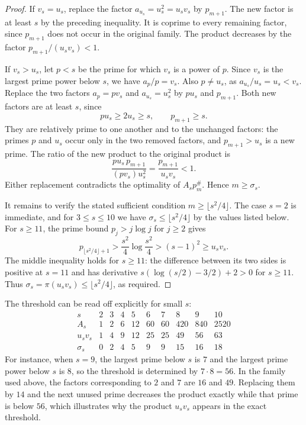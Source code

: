 \documentclass[11pt,onecolumn]{IEEEtran}
\newcommand{\primorial}[1]{p_{#1}^{\#}}
\begin{document}
\begin{proof}
If $v_s=u_s$, replace the factor
$a_{u_s}=u_s^2=u_sv_s$ by $p_{m+1}$.  The new factor is
at least $s$ by the preceding inequality.
It is coprime to every remaining factor, since
$p_{m+1}$ does not occur in the original family.
The product decreases by the factor
$p_{m+1}/(u_sv_s)<1$.

If $v_s>u_s$, let $p<s$ be the prime for which
$v_s$ is a power of $p$.  Since $v_s$ is the largest
prime power below $s$, we have $a_p/p=v_s$.
Also $p\ne u_s$, as $a_{u_s}/u_s=u_s<v_s$.
Replace the two factors $a_p=pv_s$ and
$a_{u_s}=u_s^2$ by $pu_s$ and $p_{m+1}$.
Both new factors are at least $s$, since
\[
 pu_s\ge2u_s\ge s,
 \qquad p_{m+1}\ge s.
\]
They are relatively prime to one another and to the
unchanged factors: the primes $p$ and $u_s$ occur only in
the two removed factors, and $p_{m+1}>u_s$ is a new prime.
The ratio of the new product to the original product is
\[
 \frac{pu_s\,p_{m+1}}{(pv_s)u_s^2}
 =\frac{p_{m+1}}{u_sv_s}<1.
\]
Either replacement contradicts the optimality of
$A_s\primorial{m}$.  Hence $m\ge\sigma_s$.

It remains to verify the stated sufficient condition
$m\ge\lfloor s^2/4\rfloor$.  The case $s=2$ is immediate,
and for $3\le s\le10$ we have
$\sigma_s\le\lfloor s^2/4\rfloor$ by the values listed below.
For $s\ge11$, the prime bound
$p_j>j\log j$ for $j\ge2$ \cite[(3.12)]{RosserSchoenfeld1962}
gives
\[
 p_{\lfloor s^2/4\rfloor+1}
 >\frac{s^2}{4}\log\frac{s^2}{4}
 >(s-1)^2\ge u_sv_s.
\]
The middle inequality holds for $s\ge11$: the difference
between its two sides is positive at $s=11$ and has derivative
$s(\log(s/2)-3/2)+2>0$ for $s\ge11$.
Thus $\sigma_s=\pi(u_sv_s)\le\lfloor s^2/4\rfloor$,
as required.
\end{proof}

The threshold can be read off explicitly for small $s$:
\[
\begin{array}{c|rrrrrrrrr}
 s&2&3&4&5&6&7&8&9&10\\ \hline
 A_s&1&2&6&12&60&60&420&840&2520\\
 u_sv_s&1&4&9&12&25&25&49&56&63\\
 \sigma_s&0&2&4&5&9&9&15&16&18
\end{array}
\]
For instance, when $s=9$, the largest prime below $s$ is $7$ and the
largest prime power below $s$ is $8$, so the threshold is determined by
$7\cdot8=56$. In the family used above, the factors corresponding to
$2$ and $7$ are $16$ and $49$. Replacing them by $14$ and the next
unused prime decreases the product exactly while that prime is below
$56$, which illustrates why the product $u_sv_s$ appears in the exact
threshold.
\end{document}
